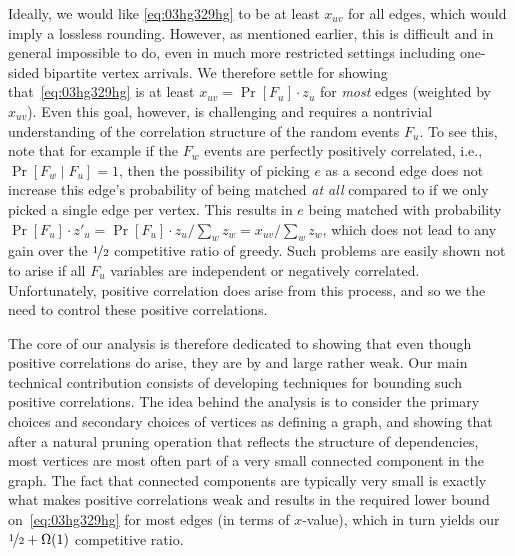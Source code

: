 Ideally, we would like \eqref{eq:03hg329hg} to be at least $x_{uv}$ for all edges, which would imply a lossless rounding.
However, as mentioned earlier, this is difficult and in general impossible to do, even in much more restricted settings including one-sided bipartite vertex arrivals. We therefore settle for showing  that~\eqref{eq:03hg329hg} is at least $x_{uv} = \Pr[F_u]\cdot z_u$ for \emph{most} edges (weighted by $x_{uv}$). Even this goal, however, is challenging and requires a nontrivial understanding of the correlation structure of the random events $F_u$. To see this, note that for example if the $F_w$ events are perfectly positively correlated, i.e., $\Pr[F_w \mid F_u]=1$, then the possibility of picking $e$ as a second edge does not increase this edge's probability of being matched \emph{at all} compared to if we only picked a single edge per vertex. This results in $e$ being matched with probability $\Pr[F_u]\cdot z'_u = \Pr[F_u]\cdot z_u / \sum_w z_w = x_{uv} / \sum_w z_w$, which does not lead to any gain over the $\nicefrac1{2}$ competitive ratio of greedy. 
Such problems are easily shown not to arise if all $F_u$ variables are independent or negatively correlated. Unfortunately, positive correlation does arise from this process, and so we the need to control these positive correlations.

The core of our analysis is therefore dedicated to showing that even though positive correlations do arise, they are by and large rather weak. Our main technical contribution consists of developing techniques for bounding such positive correlations. The idea behind the analysis is to consider the primary choices and secondary choices of vertices as defining a graph, and showing that after a natural pruning operation that reflects the structure of dependencies, most vertices are most often part of a very small connected component in the graph. The fact that connected components are typically very small is exactly what makes positive correlations weak and results in the required lower bound on~\eqref{eq:03hg329hg} for most edges (in terms of $x$-value), which in turn yields our $\nicefrac{1}{2}+\Omega(1)$ competitive ratio.